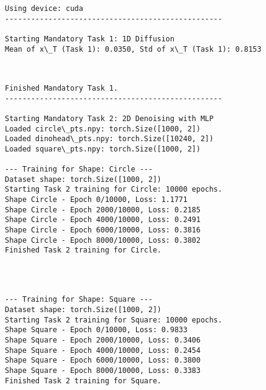 \documentclass[11pt]{article}
\begin{document}
    \begin{Verbatim}[commandchars=\\\{\}]
Using device: cuda
--------------------------------------------------

Starting Mandatory Task 1: 1D Diffusion
Mean of x\_T (Task 1): 0.0350, Std of x\_T (Task 1): 0.8153
    \end{Verbatim}

    \begin{center}
    \end{center}
    { \hspace*{\fill} \\}
    
    \begin{Verbatim}[commandchars=\\\{\}]
Finished Mandatory Task 1.
--------------------------------------------------

Starting Mandatory Task 2: 2D Denoising with MLP
Loaded circle\_pts.npy: torch.Size([1000, 2])
Loaded dinohead\_pts.npy: torch.Size([10240, 2])
Loaded square\_pts.npy: torch.Size([1000, 2])

--- Training for Shape: Circle ---
Dataset shape: torch.Size([1000, 2])
Starting Task 2 training for Circle: 10000 epochs.
Shape Circle - Epoch 0/10000, Loss: 1.1771
Shape Circle - Epoch 2000/10000, Loss: 0.2185
Shape Circle - Epoch 4000/10000, Loss: 0.2491
Shape Circle - Epoch 6000/10000, Loss: 0.3816
Shape Circle - Epoch 8000/10000, Loss: 0.3802
Finished Task 2 training for Circle.
    \end{Verbatim}

    \begin{center}
    \end{center}
    { \hspace*{\fill} \\}
    
    \begin{Verbatim}[commandchars=\\\{\}]

--- Training for Shape: Square ---
Dataset shape: torch.Size([1000, 2])
Starting Task 2 training for Square: 10000 epochs.
Shape Square - Epoch 0/10000, Loss: 0.9833
Shape Square - Epoch 2000/10000, Loss: 0.3406
Shape Square - Epoch 4000/10000, Loss: 0.2454
Shape Square - Epoch 6000/10000, Loss: 0.3800
Shape Square - Epoch 8000/10000, Loss: 0.3383
Finished Task 2 training for Square.
    \end{Verbatim}
\end{document}
